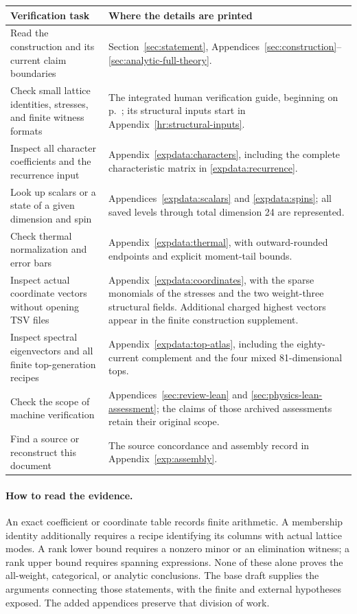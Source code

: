 \begin{longtable}{@{}P{.34\linewidth}P{.57\linewidth}@{}}
\toprule Verification task & Where the details are printed\\\midrule
\endhead
Read the construction and its current claim boundaries &
Section~\ref{sec:statement}, Appendices~\ref{sec:construction}--\ref{sec:analytic-full-theory}.\\
Check small lattice identities, stresses, and finite witness formats &
The integrated human verification guide, beginning on
p.~\pageref{hr:three-term-vector}; its structural inputs start in
Appendix~\ref{hr:structural-inputs}.\\
Inspect all character coefficients and the recurrence input &
Appendix~\ref{expdata:characters}, including the complete characteristic
matrix in \ref{expdata:recurrence}.\\
Look up scalars or a state of a given dimension and spin &
Appendices~\ref{expdata:scalars} and \ref{expdata:spins}; all saved levels
through total dimension 24 are represented.\\
Check thermal normalization and error bars &
Appendix~\ref{expdata:thermal}, with outward-rounded endpoints and
explicit moment-tail bounds.\\
Inspect actual coordinate vectors without opening TSV files &
Appendix~\ref{expdata:coordinates}, with the sparse monomials of the
stresses and the two weight-three structural fields. Additional charged
highest vectors appear in the finite construction supplement.\\
Inspect spectral eigenvectors and all finite top-generation recipes &
Appendix~\ref{expdata:top-atlas}, including the eighty-current complement
and the four mixed 81-dimensional tops.\\
Check the scope of machine verification &
Appendices~\ref{sec:review-lean} and \ref{sec:physics-lean-assessment};
the claims of those archived assessments retain their original scope.\\
Find a source or reconstruct this document &
The source concordance and assembly record in Appendix~\ref{exp:assembly}.\\
\bottomrule
\end{longtable}

\paragraph{How to read the evidence.}
An exact coefficient or coordinate table records finite arithmetic.
A membership identity additionally requires a recipe identifying its
columns with actual lattice modes. A rank lower bound requires a
nonzero minor or an elimination witness; a rank upper bound requires
spanning expressions. None of these alone proves the all-weight,
categorical, or analytic conclusions. The base draft supplies the
arguments connecting those statements, with the finite and external
hypotheses exposed. The added appendices preserve that division of work.


